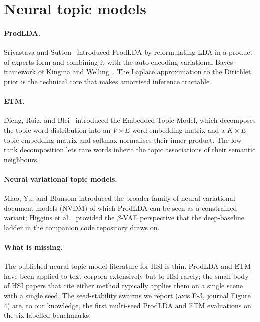\documentclass[11pt,a4paper]{article}
\begin{document}
\section{Neural topic models}

\paragraph{ProdLDA.} Srivastava and Sutton~\cite{srivastava2017autoencoding}
introduced ProdLDA by reformulating LDA in a product-of-experts
form and combining it with the auto-encoding variational Bayes
framework of Kingma and Welling~\cite{kingma2014auto}. The Laplace
approximation to the Dirichlet prior is the technical core that
makes amortised inference tractable.

\paragraph{ETM.} Dieng, Ruiz, and Blei~\cite{dieng2020topic}
introduced the Embedded Topic Model, which decomposes the topic-word
distribution into an $V \times E$ word-embedding matrix and a
$K \times E$ topic-embedding matrix and softmax-normalises their
inner product. The low-rank decomposition lets rare words inherit
the topic associations of their semantic neighbours.

\paragraph{Neural variational topic models.} Miao, Yu, and Blunsom
\cite{miao2016neural} introduced the broader family of neural
variational document models (NVDM) of which ProdLDA can be seen as
a constrained variant; Higgins et al.~\cite{higgins2017betavae}
provided the $\beta$-VAE perspective that the deep-baseline ladder
in the companion code repository draws on.

\paragraph{What is missing.} The published neural-topic-model
literature for HSI is thin. ProdLDA and ETM have been applied to
text corpora extensively but to HSI rarely; the small body of HSI
papers that cite either method typically applies them on a single
scene with a single seed. The seed-stability swarms we report
(axis F-3, journal Figure 4) are, to our knowledge, the first
multi-seed ProdLDA and ETM evaluations on the six labelled
benchmarks.
\end{document}
